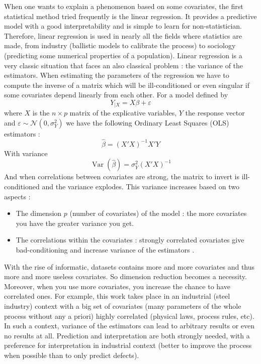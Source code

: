 \documentclass[11pt,a4paper]{article}
\begin{document}
When one wants to explain a phenomenon based on some covariates, the first statistical method tried frequently is the linear regression. It provides a predictive model with a good interpretability and is simple to learn for non-statistician. Therefore, linear regression is used in nearly all the fields where statistics are made, from industry (ballistic models to calibrate the process) to sociology (predicting some numerical properties of a population).
Linear regression is a very classic situation that faces an also classical problem : the variance of the estimators.
When estimating the parameters of the regression we have to compute the inverse of a matrix\cite{saporta2006probabilites} which will be ill-conditioned or even singular if some covariates depend linearly from each other. For a model defined by 
	\begin{equation}
		Y_{|X}=X\beta + \varepsilon
	\end{equation}
	where $X$ is the $n\times p$ matrix of the explicative variables, $Y$ the response vector and $\varepsilon \sim \mathcal{N}(0,\sigma_Y^2)$ 
	we have the following Ordinary Least Squares (OLS) estimators :
	\begin{equation}
		\hat{\beta}=\left(X'X \right) ^{-1}X'Y
	\end{equation}
	With variance 
	\begin{equation}
		\operatorname{Var}(\hat{\beta})=\sigma_Y^2(X'X)^{-1}
	\end{equation}
	And when correlations between covariates are strong, the matrix to invert is ill-conditioned and the variance explodes.
This variance increases based on two aspects :
\begin{itemize}
	\item The dimension $p$ (number of covariates) of the model  : the more covariates you have the greater variance you get.
	\item The correlations within the covariates : strongly correlated covariates give bad-conditioning and increase variance of the estimators .
\end{itemize}

	With the rise of informatic, datasets contains more and more covariates and thus more and more useless covariates. So dimension reduction becomes a necessity. Moreover, when you use more covariates, you increase the chance to have correlated ones. For example, this work takes place in an industrial (steel industry) context with a big set of covariates (many parameters of the whole process without any a priori) highly correlated (physical laws, process rules, etc). In such a context, variance of the estimators can lead to arbitrary results or even no results at all. Prediction and interpretation are both strongly needed, with a preference for interpretation in industrial context (better to improve the process when possible than to only predict defects).
		~\\	~\\
		
\end{document}
